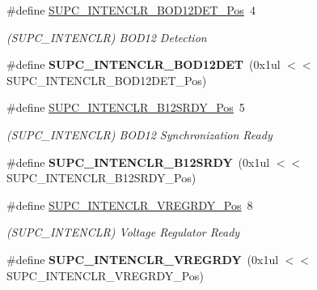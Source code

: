 \begin{DoxyCompactItemize}
\item 
\hypertarget{group___s_a_m_l21___s_u_p_c_ga77f6447f3e70312a3fcd23babeac4b75}{}\#define \hyperlink{group___s_a_m_l21___s_u_p_c_ga77f6447f3e70312a3fcd23babeac4b75}{S\+U\+P\+C\+\_\+\+I\+N\+T\+E\+N\+C\+L\+R\+\_\+\+B\+O\+D12\+D\+E\+T\+\_\+\+Pos}~4\label{group___s_a_m_l21___s_u_p_c_ga77f6447f3e70312a3fcd23babeac4b75}

\begin{DoxyCompactList}\small\item\em (S\+U\+P\+C\+\_\+\+I\+N\+T\+E\+N\+C\+L\+R) B\+O\+D12 Detection \end{DoxyCompactList}\item 
\hypertarget{group___s_a_m_l21___s_u_p_c_ga249e406be5bf2b88b8a24d4db50f043b}{}\#define {\bfseries S\+U\+P\+C\+\_\+\+I\+N\+T\+E\+N\+C\+L\+R\+\_\+\+B\+O\+D12\+D\+E\+T}~(0x1ul $<$$<$ S\+U\+P\+C\+\_\+\+I\+N\+T\+E\+N\+C\+L\+R\+\_\+\+B\+O\+D12\+D\+E\+T\+\_\+\+Pos)\label{group___s_a_m_l21___s_u_p_c_ga249e406be5bf2b88b8a24d4db50f043b}

\item 
\hypertarget{group___s_a_m_l21___s_u_p_c_gaf4188c7ffa3555f3edeb64aede09ef94}{}\#define \hyperlink{group___s_a_m_l21___s_u_p_c_gaf4188c7ffa3555f3edeb64aede09ef94}{S\+U\+P\+C\+\_\+\+I\+N\+T\+E\+N\+C\+L\+R\+\_\+\+B12\+S\+R\+D\+Y\+\_\+\+Pos}~5\label{group___s_a_m_l21___s_u_p_c_gaf4188c7ffa3555f3edeb64aede09ef94}

\begin{DoxyCompactList}\small\item\em (S\+U\+P\+C\+\_\+\+I\+N\+T\+E\+N\+C\+L\+R) B\+O\+D12 Synchronization Ready \end{DoxyCompactList}\item 
\hypertarget{group___s_a_m_l21___s_u_p_c_ga262b336664f7c240af88ef59753c32f5}{}\#define {\bfseries S\+U\+P\+C\+\_\+\+I\+N\+T\+E\+N\+C\+L\+R\+\_\+\+B12\+S\+R\+D\+Y}~(0x1ul $<$$<$ S\+U\+P\+C\+\_\+\+I\+N\+T\+E\+N\+C\+L\+R\+\_\+\+B12\+S\+R\+D\+Y\+\_\+\+Pos)\label{group___s_a_m_l21___s_u_p_c_ga262b336664f7c240af88ef59753c32f5}

\item 
\hypertarget{group___s_a_m_l21___s_u_p_c_gacd94ac4558ec49e0fff41f22ae82d121}{}\#define \hyperlink{group___s_a_m_l21___s_u_p_c_gacd94ac4558ec49e0fff41f22ae82d121}{S\+U\+P\+C\+\_\+\+I\+N\+T\+E\+N\+C\+L\+R\+\_\+\+V\+R\+E\+G\+R\+D\+Y\+\_\+\+Pos}~8\label{group___s_a_m_l21___s_u_p_c_gacd94ac4558ec49e0fff41f22ae82d121}

\begin{DoxyCompactList}\small\item\em (S\+U\+P\+C\+\_\+\+I\+N\+T\+E\+N\+C\+L\+R) Voltage Regulator Ready \end{DoxyCompactList}\item 
\hypertarget{group___s_a_m_l21___s_u_p_c_ga72e7479dfd0b00ff145739a39daf0b2c}{}\#define {\bfseries S\+U\+P\+C\+\_\+\+I\+N\+T\+E\+N\+C\+L\+R\+\_\+\+V\+R\+E\+G\+R\+D\+Y}~(0x1ul $<$$<$ S\+U\+P\+C\+\_\+\+I\+N\+T\+E\+N\+C\+L\+R\+\_\+\+V\+R\+E\+G\+R\+D\+Y\+\_\+\+Pos)\label{group___s_a_m_l21___s_u_p_c_ga72e7479dfd0b00ff145739a39daf0b2c}


\end{DoxyCompactItemize}
